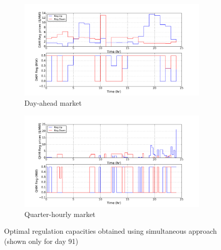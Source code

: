 \documentclass[11pt,twoside]{article}
\begin{document}
\begin{figure}[h!tp]
\centering
\begin{subfigure}[b]{0.49\textwidth} \includegraphics[width=\textwidth]{Figures/Plots/Simultaneous/DAM_Reg.pdf} \caption{Day-ahead market}\label{damregsim} \end{subfigure} \hfill
\begin{subfigure}[b]{0.49\textwidth} \includegraphics[width=\textwidth]{Figures/Plots/Simultaneous/QHM_Reg.pdf} \caption{Quarter-hourly market}\label{qhmregsim} \end{subfigure} \hfill
\caption{Optimal regulation capacities obtained using simultaneous approach (shown only for day 91)}\label{regsim}
\end{figure}
\end{document}
